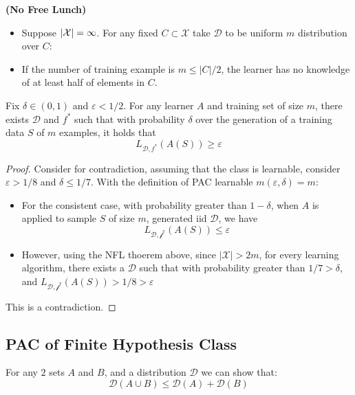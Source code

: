 \begin{theorem}{\textbf{(No Free Lunch)}} 
    \begin{itemize}
        \item Suppose $\left| \mathcal{X} \right|=\infty$. For any fixed $C\subset\mathcal{X}$ take $\mathcal{D}$ to be uniform $m$ distribution over $C$:
        \item If the number of training example is $m \le |C|/2$, the learner has no knowledge of at least half of elements in $C$. 
    \end{itemize}
    Fix $\delta\in(0, 1)$ and $\varepsilon<1/2$. For any learner $A$ and training set of size $m$, there exists $\mathcal{D}$ and $f^*$ such that with probability $\delta$ over the generation of a training data $S$ of $m$ examples, it holds that
    \begin{equation*}
        L_{\mathcal{D}, f^*}(A(S))\ge\varepsilon
    \end{equation*}
\end{theorem}
\begin{proof}
    Consider for contradiction, assuming that the class is learnable, consider $\varepsilon > 1/8$ and $\delta \le 1/7$. With the definition of PAC learnable $m(\varepsilon, \delta) = m$:
    \begin{itemize}
        \item For the consistent case, with probability greater than $1-\delta$, when $A$ is applied to sample $S$ of size $m$, generated iid $\mathcal{D}$, we have
        \begin{equation*}
            L_\mathcal{D, f^*}(A(S))  \le \varepsilon
        \end{equation*}
        \item However, using the NFL thoerem above, since $|\mathcal{X}|>2m$, for every learning algorithm, there exists a $\mathcal{D}$ such that with probability greater than $1/7>\delta$, and $L_\mathcal{D, f^*}(A(S)) > 1/8>\varepsilon$
    \end{itemize}
    This is a contradiction. 
\end{proof}

\subsection{PAC of Finite Hypothesis Class}

\begin{lemma}
    For any $2$ sets $A$ and $B$, and a distribution $\mathcal{D}$ we can show that:
    \begin{equation*}
        \mathcal{D}(A\cup B) \le \mathcal{D}(A) + \mathcal{D}(B)
    \end{equation*}
\end{lemma}

